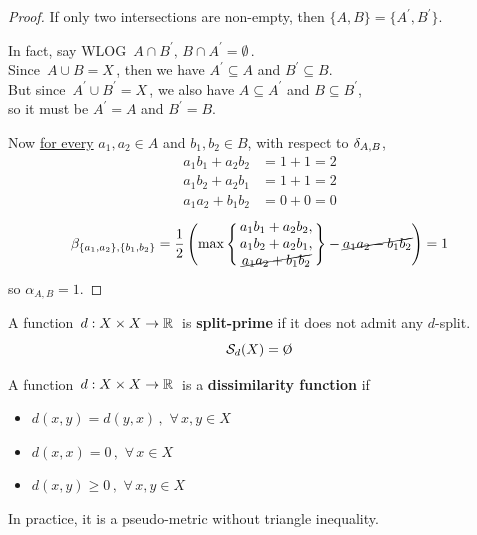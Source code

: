 \documentclass[./main.tex]{subfiles}
\begin{document}
\begin{proof}
    If only two intersections are non-empty, then $\{A,B\} = \{A^\prime,B^\prime\}$.
    
    In fact, say WLOG $\, A \cap B^\prime,\, B \cap A^\prime = \emptyset \,$. \\
    Since $\, A \cup B = X \,$, then we have $A^\prime \subseteq A$ and $B^\prime \subseteq B$. \\
    But since $\, A^\prime \cup B^\prime = X \,$, we also have $A \subseteq A^\prime$ and $B \subseteq B^\prime$, \\
    \bsp so it must be $A^\prime = A$ and $B^\prime = B$.
    
    Now \underline{for every} $a_1,a_2 \in A$ and $b_1,b_2 \in B$, with respect to $\delta_{A,B}$,
    \begin{align*}
        a_1 b_1 + a_2 b_2 &= 1 + 1 = 2 \\
        a_1 b_2 + a_2 b_1 &= 1 + 1 = 2 \\
        a_1 a_2 + b_1 b_2 &= 0 + 0 = 0
    \end{align*}
    \[ \beta_{\{a_1,a_2\},\{b_1,b_2\}} = \frac{1}{2}\, \Biggl( \max {\Biggl\{\!\!
        \begin{array}{c}
            a_1 b_1 + a_2 b_2, \\
            a_1 b_2 + a_2 b_1, \\
            \cancel{a_1 a_2 + b_1 b_2}
        \end{array}
    \!\!\Biggr\}} - \cancel{a_1 a_2 - b_1 b_2} \Biggr) = 1 \]
    so $\alpha_{A,B} = 1$.
\end{proof}

\clearpage

\begin{definition}
    A function $\, d : {X \times X} \to \mathbb{R} \,$ is \textbf{split-prime} if it does not admit any $d$-split.
    \[ \Sc_d(X) = \emptyset \nospblw \]
\end{definition}

\begin{definition}
    A function $\, d : {X \times X} \to \mathbb{R} \,$ is a \textbf{dissimilarity function} if
    \begin{itemize}
        \item $d(x,y) = d(y,x) \,,$  \tabto*{10em} $\forall\, x,y \in X$
        \item $d(x,x) = 0 \,,$       \tabto*{10em} $\forall\, x \in X$
        \item $d(x,y) \geq 0 \,,$    \tabto*{10em} $\forall\, x,y \in X$
    \end{itemize}
\end{definition}
In practice, it is a pseudo-metric without triangle inequality.
\end{document}
